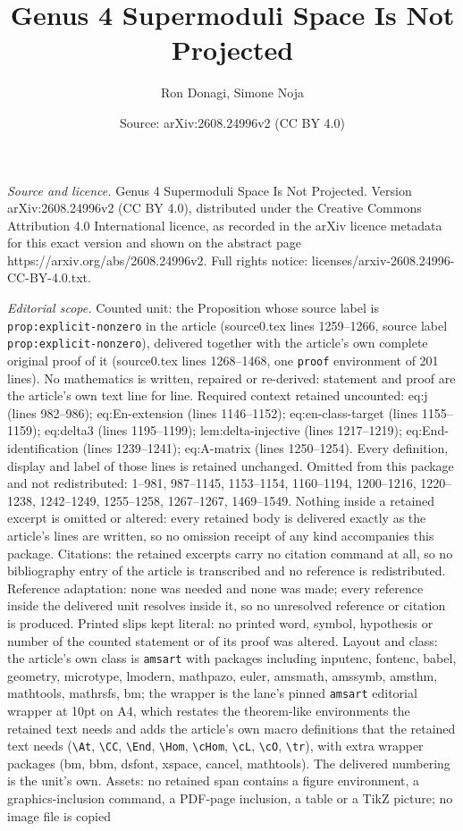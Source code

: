 \documentclass[10pt,a4paper]{amsart}
\title[Genus 4 Supermoduli Space Is Not Projected]{Genus 4 Supermoduli Space Is Not Projected}
\author{Ron Donagi, Simone Noja}
\date{Source: arXiv:2608.24996v2 (CC BY 4.0)}
\begin{document}
\maketitle

\noindent\emph{Source and licence.} Genus 4 Supermoduli Space Is Not Projected. Version arXiv:2608.24996v2 (CC BY 4.0), distributed under the Creative Commons Attribution 4.0 International licence, as recorded in the arXiv licence metadata for this exact version and shown on the abstract page https://arxiv.org/abs/2608.24996v2. Full rights notice: licenses/arxiv-2608.24996-CC-BY-4.0.txt.\par\smallskip

\noindent\textit{Editorial scope.} Counted unit: the Proposition whose source label is \texttt{prop:explicit-nonzero} in the article (source0.tex lines 1259--1266, source label \texttt{prop:explicit-nonzero}), delivered together with the article's own complete original proof of it (source0.tex lines 1268--1468, one \texttt{proof} environment of 201 lines). No mathematics is written, repaired or re-derived: statement and proof are the article's own text line for line. Required context retained uncounted: eq:j (lines 982--986); eq:En-extension (lines 1146--1152); eq:en-class-target (lines 1155--1159); eq:delta3 (lines 1195--1199); lem:delta-injective (lines 1217--1219); eq:End-identification (lines 1239--1241); eq:A-matrix (lines 1250--1254). Every definition, display and label of those lines is retained unchanged. Omitted from this package and not redistributed: 1--981, 987--1145, 1153--1154, 1160--1194, 1200--1216, 1220--1238, 1242--1249, 1255--1258, 1267--1267, 1469--1549. Nothing inside a retained excerpt is omitted or altered: every retained body is delivered exactly as the article's lines are written, so no omission receipt of any kind accompanies this package. Citations: the retained excerpts carry no citation command at all, so no bibliography entry of the article is transcribed and no reference is redistributed. Reference adaptation: none was needed and none was made; every reference inside the delivered unit resolves inside it, so no unresolved reference or citation is produced. Printed slips kept literal: no printed word, symbol, hypothesis or number of the counted statement or of its proof was altered. Layout and class: the article's own class is \texttt{amsart} with packages including inputenc, fontenc, babel, geometry, microtype, lmodern, mathpazo, euler, amsmath, amssymb, amsthm, mathtools, mathrsfs, bm; the wrapper is the lane's pinned \texttt{amsart} editorial wrapper at 10pt on A4, which restates the theorem-like environments the retained text needs and adds the article's own macro definitions that the retained text needs (\texttt{\textbackslash At}, \texttt{\textbackslash CC}, \texttt{\textbackslash End}, \texttt{\textbackslash Hom}, \texttt{\textbackslash cHom}, \texttt{\textbackslash cL}, \texttt{\textbackslash cO}, \texttt{\textbackslash tr}), with extra wrapper packages (bm, bbm, dsfont, xspace, cancel, mathtools). The delivered numbering is the unit's own. Assets: no retained span contains a figure environment, a graphics-inclusion command, a PDF-page inclusion, a table or a TikZ picture; no image file is copied 
\end{document}

